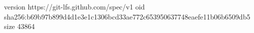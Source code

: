 version https://git-lfs.github.com/spec/v1
oid sha256:b69b97b899d4d1e3e1c1306bcd33ae772c653950637748eaefe11b06b6509db5
size 43864

